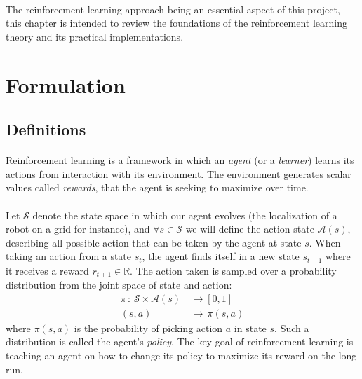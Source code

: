 \documentclass[a4paper]{report}
\begin{document}
	{
		\paragraph{} The reinforcement learning approach being an essential aspect of this project, this chapter is intended to review the foundations of the reinforcement learning theory and its practical implementations. 
		\section{Formulation}
		{
			\subsection{Definitions}
			{
				\paragraph{} Reinforcement learning is a framework in which an \emph{agent} (or a \emph{learner}) learns its actions from interaction with its environment. The environment generates scalar values called \emph{rewards}, that the agent is seeking to maximize over time. 
			
				\paragraph{} Let $\mathcal{S}$ denote the state space in which our agent evolves (the localization of a robot on a grid for instance), and $\forall{s}\in\mathcal{S}$ we will define the action state $\mathcal{A}(s)$, describing all possible action that can be taken by the agent at state $s$. When taking an action from a state $s_t$, the agent finds itself in a new state $s_{t+1}$ where it receives a reward $r_{t+1}\in\mathbb{R}$. The action taken is sampled over a probability distribution from the joint space of state and action: 
				\begin{equation}
					\begin{aligned}
						\pi \,  : \, \mathcal{S}\times\mathcal{A}(s) \, &\to [0,1]\\
							 (s,a) \, &\to \,  \pi(s,a)
					\end{aligned}
				\end{equation}	
				where $\pi(s,a)$ is the probability of picking action $a$ in state $s$. Such a distribution is called the agent's \emph{policy}. The key goal of reinforcement learning is teaching an agent on how to change its policy to maximize its reward on the long run. 
				
}}}
\end{document}
